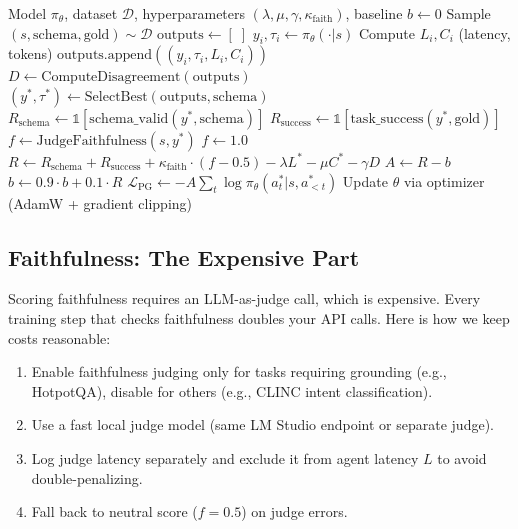 \documentclass[11pt]{article}
\begin{document}
\begin{algorithm}[t]
\caption{REINFORCE with Baseline for SLO-Aware Agent Training}
\label{alg:reinforce}
\begin{algorithmic}[1]
\Require Model $\pi_\theta$, dataset $\mathcal{D}$, hyperparameters $(\lambda, \mu, \gamma, \kappa_{\text{faith}})$, baseline $b \leftarrow 0$
    \State Sample $(s, \text{schema}, \text{gold}) \sim \mathcal{D}$
    \State $\text{outputs} \leftarrow [\;]$
        \State $y_i, \tau_i \leftarrow \pi_\theta(\cdot | s)$ 
        \State Compute $L_i, C_i$ (latency, tokens)
        \State $\text{outputs.append}((y_i, \tau_i, L_i, C_i))$
    \EndFor
    \State $D \leftarrow \text{ComputeDisagreement}(\text{outputs})$
    \State $(y^*, \tau^*) \leftarrow \text{SelectBest}(\text{outputs}, \text{schema})$ 
    \State $R_{\text{schema}} \leftarrow \mathbb{1}[\text{schema\_valid}(y^*, \text{schema})]$
    \State $R_{\text{success}} \leftarrow \mathbb{1}[\text{task\_success}(y^*, \text{gold})]$
        \State $f \leftarrow \text{JudgeFaithfulness}(s, y^*)$ 
    \Else
        \State $f \leftarrow 1.0$
    \EndIf
    \State $R \leftarrow R_{\text{schema}} + R_{\text{success}} + \kappa_{\text{faith}} \cdot (f - 0.5) - \lambda L^* - \mu C^* - \gamma D$
    \State $A \leftarrow R - b$ 
    \State $b \leftarrow 0.9 \cdot b + 0.1 \cdot R$ 
    \State $\mathcal{L}_{\text{PG}} \leftarrow -A \sum_{t} \log \pi_\theta(a_t^* | s, a_{<t}^*)$
    \State Update $\theta$ via optimizer (AdamW + gradient clipping)
\EndFor
\end{algorithmic}
\end{algorithm}

\subsection{Faithfulness: The Expensive Part}

Scoring faithfulness requires an LLM-as-judge call, which is expensive.
Every training step that checks faithfulness doubles your API calls.
Here is how we keep costs reasonable:
\begin{enumerate}[leftmargin=12pt]
    \item Enable faithfulness judging only for tasks requiring grounding (e.g., HotpotQA), disable for others (e.g., CLINC intent classification).
    \item Use a fast local judge model (same LM Studio endpoint or separate judge).
    \item Log judge latency separately and exclude it from agent latency $L$ to avoid double-penalizing.
    \item Fall back to neutral score ($f = 0.5$) on judge errors.
\end{enumerate}
\end{document}
